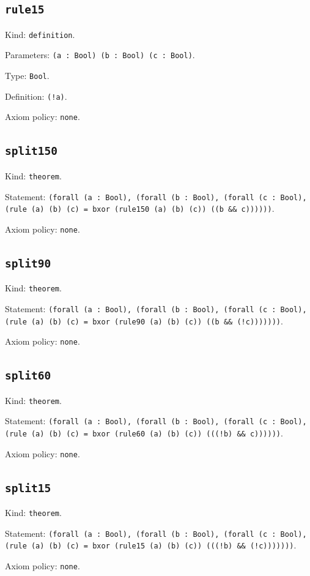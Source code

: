 \documentclass[11pt]{article}
\begin{document}
\subsection*{\texttt{rule15}}
\noindent Kind: \texttt{definition}.\par
\noindent Parameters: \texttt{(a : Bool) (b : Bool) (c : Bool)}.\par
\noindent Type: \texttt{Bool}.\par
\noindent Definition: \texttt{(!a)}.\par
\noindent Axiom policy: \texttt{none}.\par
\subsection*{\texttt{split150}}
\noindent Kind: \texttt{theorem}.\par
\noindent Statement: \texttt{(forall (a : Bool), (forall (b : Bool), (forall (c : Bool), (rule (a) (b) (c) = bxor (rule150 (a) (b) (c)) ((b \&\& c))))))}.\par
\noindent Axiom policy: \texttt{none}.\par
\subsection*{\texttt{split90}}
\noindent Kind: \texttt{theorem}.\par
\noindent Statement: \texttt{(forall (a : Bool), (forall (b : Bool), (forall (c : Bool), (rule (a) (b) (c) = bxor (rule90 (a) (b) (c)) ((b \&\& (!c)))))))}.\par
\noindent Axiom policy: \texttt{none}.\par
\subsection*{\texttt{split60}}
\noindent Kind: \texttt{theorem}.\par
\noindent Statement: \texttt{(forall (a : Bool), (forall (b : Bool), (forall (c : Bool), (rule (a) (b) (c) = bxor (rule60 (a) (b) (c)) (((!b) \&\& c))))))}.\par
\noindent Axiom policy: \texttt{none}.\par
\subsection*{\texttt{split15}}
\noindent Kind: \texttt{theorem}.\par
\noindent Statement: \texttt{(forall (a : Bool), (forall (b : Bool), (forall (c : Bool), (rule (a) (b) (c) = bxor (rule15 (a) (b) (c)) (((!b) \&\& (!c)))))))}.\par
\noindent Axiom policy: \texttt{none}.\par
\end{document}
